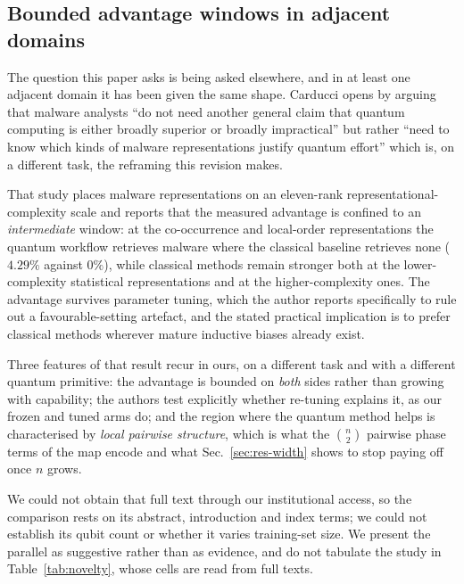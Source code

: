 \subsection{Bounded advantage windows in adjacent domains}
\begin{revbody}

The question this paper asks is being asked elsewhere, and in at least one
adjacent domain it has been given the same shape. Carducci \cite{carducci2026}
opens by arguing that malware analysts ``do not need another general claim that
quantum computing is either broadly superior or broadly impractical'' but rather
``need to know which kinds of malware representations justify quantum effort''
which is, on a different task, the reframing this revision makes.

That study places malware representations on an eleven-rank
representational-complexity scale and reports that the measured advantage is
confined to an \emph{intermediate} window: at the co-occurrence and local-order
representations the quantum workflow retrieves malware where the classical
baseline retrieves none ($4.29\%$ against $0\%$), while classical methods remain
stronger both at the lower-complexity statistical representations and at the
higher-complexity ones. The advantage survives parameter tuning, which the
author reports specifically to rule out a favourable-setting artefact, and the
stated practical implication is to prefer classical methods wherever mature
inductive biases already exist.

Three features of that result recur in ours, on a different task and with a
different quantum primitive: the advantage is bounded on \emph{both} sides
rather than growing with capability; the authors test explicitly whether
re-tuning explains it, as our frozen and tuned arms do; and the region where the
quantum method helps is characterised by \emph{local pairwise structure}, which
is what the $\binom{n}{2}$ pairwise phase terms of the \ZZ{} map encode and what
Sec.~\ref{sec:res-width} shows to stop paying off once $n$ grows.

We could not obtain that full text through our institutional access, so the
comparison rests on its abstract, introduction and index terms; we could not
establish its qubit count or whether it varies training-set size. We present the
parallel as suggestive rather than as evidence, and do not tabulate the study in
Table~\ref{tab:novelty}, whose cells are read from full texts.
\end{revbody}

